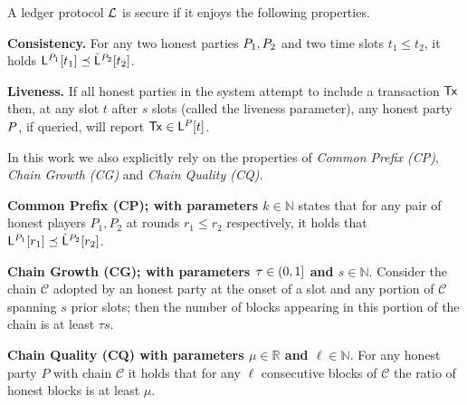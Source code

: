 \begin{definition}\label{de:ledger} A ledger protocol $\mathcal{L}$ is secure if it enjoys the following properties.



\begin{myitemize}
  \item[]{\bf Consistency.}
    For any two honest parties $P_1,P_2$ and two time slots $t_1\leq t_2$,
    it holds  $\mathsf{L}^{P_1}[t_1] \preceq
    \check{\mathsf{L}}^{P_2}[t_2]$.

  \item[]{\bf Liveness.}
    If all honest parties in the system attempt to include a  transaction $\mathsf{Tx}$
    then, at any slot $t$ after $s$ slots (called the
    liveness parameter), any honest party $P$, if queried,
    will report $\mathsf{Tx} \in \mathsf{L}^{P}[t]$.
\end{myitemize}

\end{definition}

In this work we also explicitly rely on the properties of \emph{Common Prefix (CP)}, \emph{Chain Growth (CG)} 
and  \emph{Chain Quality (CQ)}. 

\begin{myitemize}
  \item[] {\bf Common Prefix (CP); with parameters $k\in\mathbb{N}$} 
states that for any pair of honest players  $P_1,P_2$ at rounds $r_1\leq r_2$ respectively, it holds that  ${ \mathsf{L}}^{P_1}[r_1] \preceq  {\check {\mathsf{L}}}^{P_2}[r_2] $.    
  \item[] {\bf Chain Growth (CG); with parameters $\tau\in (0,1]$ and $s\in\mathbb{N}$}. Consider the chain $\mathcal{C}$
  adopted by an honest party at the onset of a slot and any portion of $\mathcal{C}$ spanning $s$ prior slots; then the number of
  blocks appearing in this portion of the chain is at least $\tau s$.
  
  \item[] {\bf Chain Quality (CQ) with parameters $\mu\in\mathbb{R}$
and $\ell\in\mathbb{N}$}. For any honest party $P$ with chain $\mathcal{C}$  it holds that for any $\ell$ consecutive blocks of $\mathcal{C}$ the ratio of honest blocks is at least $\mu$.
 \end{myitemize}



